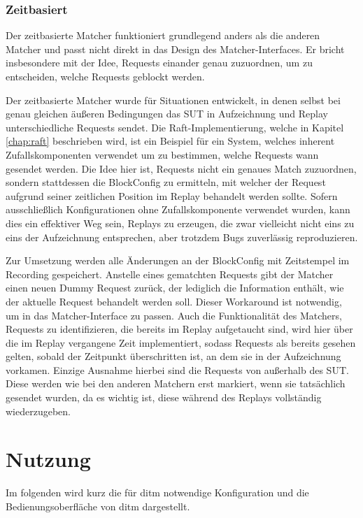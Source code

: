\documentclass[12pt,a4paper]{report}
\begin{document}
\subsubsection{Zeitbasiert}
Der zeitbasierte Matcher funktioniert grundlegend anders als die anderen Matcher und passt nicht direkt in das Design des
Matcher-Interfaces. Er bricht insbesondere mit der Idee, Requests einander genau zuzuordnen, um zu entscheiden, welche Requests
geblockt werden.

Der zeitbasierte Matcher wurde für Situationen entwickelt, in denen selbst bei genau gleichen äußeren Bedingungen das SUT in
Aufzeichnung und Replay unterschiedliche Requests sendet. Die Raft-Implementierung, welche in Kapitel \ref{chap:raft} beschrieben
wird, ist ein Beispiel für ein System, welches inherent Zufallskomponenten verwendet um zu bestimmen, welche Requests wann
gesendet werden.  Die Idee hier ist, Requests nicht ein genaues Match zuzuordnen, sondern stattdessen die BlockConfig zu
ermitteln, mit welcher der Request aufgrund seiner zeitlichen Position im Replay behandelt werden sollte. Sofern ausschließlich
Konfigurationen ohne Zufallskomponente verwendet wurden, kann dies ein effektiver Weg sein, Replays zu erzeugen, die zwar
vielleicht nicht eins zu eins der Aufzeichnung entsprechen, aber trotzdem Bugs zuverlässig reproduzieren.

Zur Umsetzung werden alle Änderungen an der BlockConfig mit Zeitstempel im Recording gespeichert. Anstelle eines gematchten
Requests gibt der Matcher einen neuen Dummy Request zurück, der lediglich die Information enthält, wie der aktuelle Request
behandelt werden soll. Dieser Workaround ist notwendig, um in das Matcher-Interface zu passen. Auch die Funktionalität des
Matchers, Requests zu identifizieren, die bereits im Replay aufgetaucht sind, wird hier über die im Replay vergangene Zeit
implementiert, sodass Requests als bereits gesehen gelten, sobald der Zeitpunkt überschritten ist, an dem sie in der Aufzeichnung
vorkamen. Einzige Ausnahme hierbei sind die Requests von außerhalb des SUT. Diese werden wie bei den anderen Matchern erst markiert,
wenn sie tatsächlich gesendet wurden, da es wichtig ist, diese während des Replays vollständig wiederzugeben.

\section{Nutzung}
Im folgenden wird kurz die für ditm notwendige Konfiguration und die Bedienungsoberfläche von ditm dargestellt.
\end{document}
